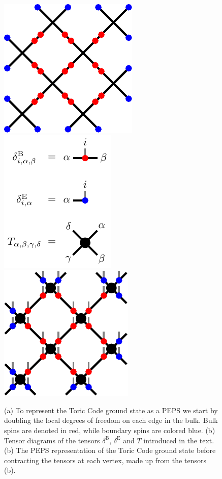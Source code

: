\begin{figure}
	\centering
	\subcaptionbox{\label{fig:toric_code_doubling_dof}}
	{%
		\includegraphics[scale=1]{figures/tikz/toric_code/peps_representation/peps_representation_a.pdf}
	}
	\quad
	\subcaptionbox{\label{fig:toric_code_PEPS_representation_tensor_definitions}}
	{%
		\includegraphics[scale=1]{figures/tikz/toric_code/peps_representation/peps_representation_b.pdf}
	}
	\quad
	\subcaptionbox{\label{fig:toric_code_PEPS_representation}}
	{%
		\includegraphics[scale=1]{figures/tikz/toric_code/peps_representation/peps_representation_c.pdf}
	}
	\caption{(a) To represent the Toric Code ground state as a PEPS we start by doubling the local degrees of freedom on each edge in the bulk. Bulk spins are denoted in red, while boundary spins are colored blue. (b) Tensor diagrams of the tensors $\delta^\text{B}$, $\delta^\text{E}$ and $T$ introduced in the text. (b) The PEPS representation of the Toric Code ground state before contracting the tensors at each vertex, made up from the tensors (b).}
	\label{fig:toric_code_doubling_dof_and_PEPS_representation}
\end{figure}
